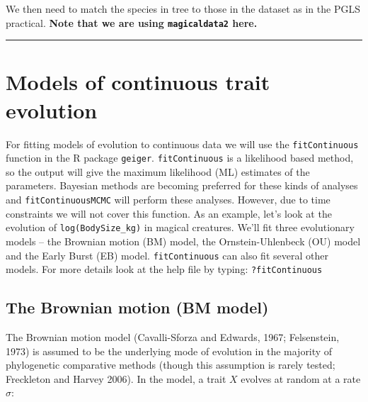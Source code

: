 \documentclass[]{book}
\newenvironment{Shaded}{\begin{snugshade}}{\end{snugshade}}
\newcommand{\KeywordTok}[1]{\textcolor[rgb]{0.13,0.29,0.53}{\textbf{{#1}}}}
\newcommand{\StringTok}[1]{\textcolor[rgb]{0.31,0.60,0.02}{{#1}}}
\newcommand{\NormalTok}[1]{{#1}}
\theoremstyle{definition}
\theoremstyle{definition}
\theoremstyle{definition}
\theoremstyle{remark}
\begin{document}
We then need to match the species in tree to those in the dataset as in
the PGLS practical. \textbf{Note that we are using \texttt{magicaldata2}
here.}

\begin{Shaded}
\end{Shaded}

\begin{center}\rule{0.5\linewidth}{\linethickness}\end{center}

\section{Models of continuous trait
evolution}\label{models-of-continuous-trait-evolution}

For fitting models of evolution to continuous data we will use the
\texttt{fitContinuous} function in the R package \texttt{geiger}.
\texttt{fitContinuous} is a likelihood based method, so the output will
give the maximum likelihood (ML) estimates of the parameters. Bayesian
methods are becoming preferred for these kinds of analyses and
\texttt{fitContinuousMCMC} will perform these analyses. However, due to
time constraints we will not cover this function. As an example, let's
look at the evolution of \texttt{log(BodySize\_kg)} in magical
creatures. We'll fit three evolutionary models -- the Brownian motion
(BM) model, the Ornstein-Uhlenbeck (OU) model and the Early Burst (EB)
model. \texttt{fitContinuous} can also fit several other models. For
more details look at the help file by typing: \texttt{?fitContinuous}

\subsection{The Brownian motion (BM
model)}\label{the-brownian-motion-bm-model}

The Brownian motion model (Cavalli-Sforza and Edwards, 1967;
Felsenstein, 1973) is assumed to be the underlying mode of evolution in
the majority of phylogenetic comparative methods (though this assumption
is rarely tested; Freckleton and Harvey 2006). In the model, a trait
\(X\) evolves at random at a rate \(\sigma\):
\end{document}
